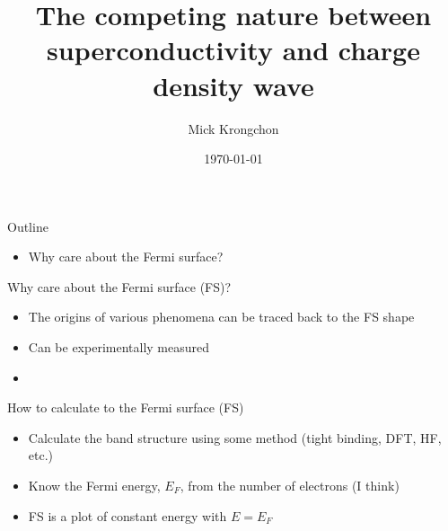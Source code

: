 \documentclass{beamer}
\title[]{The competing nature between superconductivity and charge density wave}
\author{Mick Krongchon}
\institute{University of Illinois at Urbana-Champaign}
\date{\today}
\begin{document}
\begin{frame}
\titlepage
\end{frame}


\begin{frame}{Outline}
\begin{itemize}
\item Why care about the Fermi surface?
\end{itemize}
\end{frame}

\begin{frame}{Why care about the Fermi surface (FS)?}
\begin{itemize}
  \item The origins of various phenomena can be traced back to the FS shape
  \item Can be experimentally measured
  \item



\end{itemize}
\end{frame}

\begin{frame}{How to calculate to the Fermi surface (FS)}
\begin{itemize}
  \item Calculate the band structure using some method (tight binding, DFT, HF, etc.)
  \item Know the Fermi energy, $E_F$, from the number of electrons (I think)
  \item FS is a plot of constant energy with $E = E_F$
\end{itemize}
\end{frame}
\end{document}
